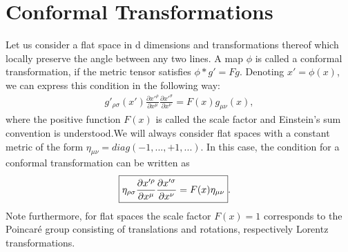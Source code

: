 \documentclass[12pt,a4paper]{report}
\begin{document}
\section{Conformal Transformations}
Let us consider a flat space in d dimensions and transformations thereof which locally preserve the angle between any two lines. A map $\phi$ is called a conformal transformation, if the metric tensor satisfies $\phi*g'=Fg$. Denoting $x'=\phi(x)$, we can express this condition in the following way: \cite{Antonin, Ralph, Francesco, Schellekens, Alday}
\begin{align}
    g'_{\rho\sigma}(x')\frac{\partial x'^{\rho}}{\partial x^{\mu}}\frac{\partial x'^{\sigma}}{\partial x^{\nu}}=F(x)g_{\mu\nu}(x),
\end{align}
where the positive function $F(x)$ is called the scale factor and Einstein’s sum convention is understood.We will always consider flat spaces with a constant metric of
the form $\eta_{\mu\nu} = diag(−1,..., +1,...)$. In this case, the condition for a conformal transformation can be written as
\begin{align}
    \Aboxed{\eta_{\rho\sigma}\frac{\partial x'^{\rho}}{\partial x^{\mu}}\frac{\partial x'^{\sigma}}{\partial x^{\nu}}=F(x)\eta_{\mu\nu}}.\label{2.1}
\end{align}
Note furthermore, for flat spaces the scale factor $F(x) = 1$ corresponds to the Poincaré group consisting of translations and rotations, respectively Lorentz transformations.
\end{document}
